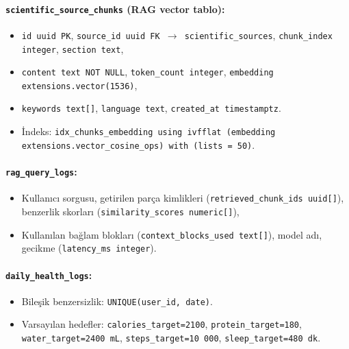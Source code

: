 \paragraph{\texttt{scientific\_source\_chunks} (RAG vector tablo):}
\begin{itemize}
\item \texttt{id uuid PK}, \texttt{source\_id uuid FK $\to$ scientific\_sources}, \texttt{chunk\_index integer}, \texttt{section text},
\item \texttt{content text NOT NULL}, \texttt{token\_count integer}, \texttt{embedding extensions.vector(1536)},
\item \texttt{keywords text[]}, \texttt{language text}, \texttt{created\_at timestamptz}.
\item İndeks: \texttt{idx\_chunks\_embedding using ivfflat (embedding extensions.vector\_cosine\_ops) with (lists = 50)}.
\end{itemize}

\paragraph{\texttt{rag\_query\_logs}:}
\begin{itemize}
\item Kullanıcı sorgusu, getirilen parça kimlikleri (\texttt{retrieved\_chunk\_ids uuid[]}), benzerlik skorları (\texttt{similarity\_scores numeric[]}),
\item Kullanılan bağlam blokları (\texttt{context\_blocks\_used text[]}), model adı, gecikme (\texttt{latency\_ms integer}).
\end{itemize}

\paragraph{\texttt{daily\_health\_logs}:}
\begin{itemize}
\item Bileşik benzersizlik: \texttt{UNIQUE(user\_id, date)}.
\item Varsayılan hedefler: \texttt{calories\_target=2100}, \texttt{protein\_target=180}, \texttt{water\_target=2400 mL}, \texttt{steps\_target=10\,000}, \texttt{sleep\_target=480 dk}.
\end{itemize}
